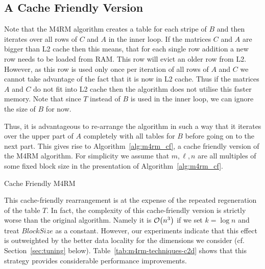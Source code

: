 \subsection{A Cache Friendly Version}
Note that the M4RM algorithm creates a table for each stripe of $B$ and then iterates over all rows of $C$ and $A$ in the inner loop. If the matrices $C$ and $A$ are bigger than L2 cache then this means, that for each single row addition a new row needs to be loaded from RAM. This row will evict an older row from L2. However, as this row is used only once per iteration of all rows of $A$ and $C$ we cannot take advantage of the fact that it is now in L2 cache. Thus if the matrices $A$ and $C$ do not fit into L2 cache then the algorithm does not utilise this faster memory. Note that since $T$ instead of $B$ is used in the inner loop, we can ignore the size of $B$ for now.

Thus, it is advantageous to re-arrange the algorithm in such a way that it iterates over the upper part of $A$ completely with all tables for $B$
before going on to the next part. This gives rise to Algorithm~\ref{alg:m4rm_cf}, a cache friendly version of the M4RM algorithm. For simplicity we assume that $m,\ell,n$ are all multiples of some fixed block size in the presentation of Algorithm~\ref{alg:m4rm_cf}.


\begin{algorithm}[H]

\caption{Cache Friendly \textsc{M4RM}}
\label{alg:m4rm_cf}
\end{algorithm}

This cache-friendly rearrangement is at the expense of the repeated regeneration of the table $T$. In fact, the complexity of this cache-friendly
version is strictly worse than the original algorithm. Namely it is $\mathcal{O}\!\left(n^3\right)$ if we set $k = \log n$ and treat $BlockSize$ as a constant.
However, our experiments indicate that this effect is outweighted by the better data locality for the dimensions we consider (cf. Section~\ref{sec:tuning} below). Table~\ref{tab:m4rm-techniques-c2d} shows that this strategy provides considerable performance improvements.

